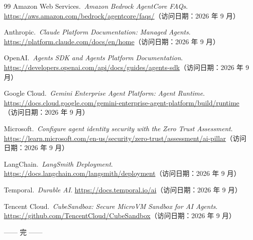 \clearpage
\begingroup
\raggedright
\sloppy
\begin{thebibliography}{99}
\small
{}
Amazon Web Services.\ \emph{Amazon Bedrock AgentCore FAQs}.\newblock
\url{https://aws.amazon.com/bedrock/agentcore/faqs/}（访问日期：2026 年 9 月）

Anthropic.\ \emph{Claude Platform Documentation: Managed Agents}.\newblock
\url{https://platform.claude.com/docs/en/home}（访问日期：2026 年 9 月）

OpenAI.\ \emph{Agents SDK and Agents Platform Documentation}.\newblock
\url{https://developers.openai.com/api/docs/guides/agents-sdk}（访问日期：2026 年 9 月）

Google Cloud.\ \emph{Gemini Enterprise Agent Platform: Agent Runtime}.\newblock
\url{https://docs.cloud.google.com/gemini-enterprise-agent-platform/build/runtime}（访问日期：2026 年 9 月）

Microsoft.\ \emph{Configure agent identity security with the Zero Trust Assessment}.\newblock
\url{https://learn.microsoft.com/en-us/security/zero-trust/assessment/ai-pillar}（访问日期：2026 年 9 月）

LangChain.\ \emph{LangSmith Deployment}.\newblock
\url{https://docs.langchain.com/langsmith/deployment}（访问日期：2026 年 9 月）

Temporal.\ \emph{Durable AI}.\newblock
\url{https://docs.temporal.io/ai}（访问日期：2026 年 9 月）

Tencent Cloud.\ \emph{CubeSandbox: Secure MicroVM Sandbox for AI Agents}.\newblock
\url{https://github.com/TencentCloud/CubeSandbox}（访问日期：2026 年 9 月）
\end{thebibliography}
\endgroup

\vfill
\begin{center}
  \color{Muted}\small
  —— 完 ——
\end{center}
